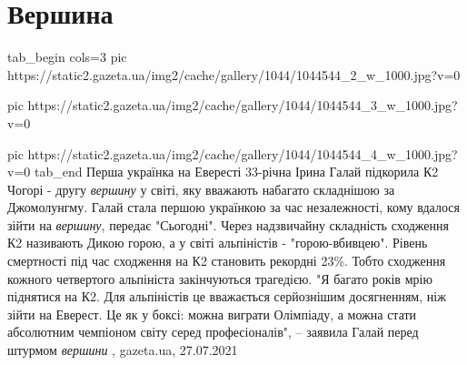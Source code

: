  
 
 
 
 
\chapter{Вершина}

\ifcmt
  tab_begin cols=3
     pic https://static2.gazeta.ua/img2/cache/gallery/1044/1044544_2_w_1000.jpg?v=0

     pic https://static2.gazeta.ua/img2/cache/gallery/1044/1044544_3_w_1000.jpg?v=0
		 
		 pic https://static2.gazeta.ua/img2/cache/gallery/1044/1044544_4_w_1000.jpg?v=0
  tab_end
\fi
Перша українка на Евересті 33-річна Ірина Галай підкорила К2 Чогорі - другу
\emph{вершину} у світі, яку вважають набагато складнішою за Джомолунгму.
Галай стала першою українкою за час незалежності, кому вдалося зійти на
\emph{вершину}, передає "Сьогодні". Через надзвичайну складність сходження К2
називають Дикою горою, а у світі альпіністів - "горою-вбивцею". Рівень
смертності під час сходження на К2 становить рекордні 23\%. Тобто сходження
кожного четвертого альпініста закінчуються трагедією.
"Я багато років мрію піднятися на К2. Для альпіністів це вважається серйознішим
досягненням, ніж зійти на Еверест. Це як у боксі: можна виграти Олімпіаду, а
можна стати абсолютним чемпіоном світу серед професіоналів", – заявила Галай
перед штурмом \emph{вершини}
, 
gazeta.ua, 27.07.2021
